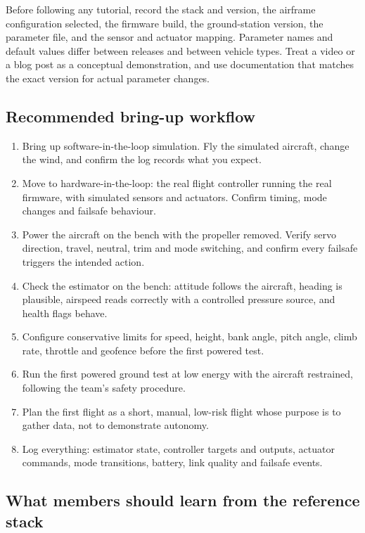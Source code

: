 \documentclass[11pt,a4paper]{article}
\begin{document}
Before following any tutorial, record the stack and version, the airframe
configuration selected, the firmware build, the ground-station version, the
parameter file, and the sensor and actuator mapping. Parameter names and
default values differ between releases and between vehicle types. Treat a video
or a blog post as a conceptual demonstration, and use documentation that
matches the exact version for actual parameter changes.

\subsection{Recommended bring-up workflow}

\begin{enumerate}
  \item Bring up software-in-the-loop simulation. Fly the simulated aircraft, change the wind, and confirm the log records what you expect.
  \item Move to hardware-in-the-loop: the real flight controller running the real firmware, with simulated sensors and actuators. Confirm timing, mode changes and failsafe behaviour.
  \item Power the aircraft on the bench with the propeller removed. Verify servo direction, travel, neutral, trim and mode switching, and confirm every failsafe triggers the intended action.
  \item Check the estimator on the bench: attitude follows the aircraft, heading is plausible, airspeed reads correctly with a controlled pressure source, and health flags behave.
  \item Configure conservative limits for speed, height, bank angle, pitch angle, climb rate, throttle and geofence before the first powered test.
  \item Run the first powered ground test at low energy with the aircraft restrained, following the team's safety procedure.
  \item Plan the first flight as a short, manual, low-risk flight whose purpose is to gather data, not to demonstrate autonomy.
  \item Log everything: estimator state, controller targets and outputs, actuator commands, mode transitions, battery, link quality and failsafe events.
\end{enumerate}

\subsection{What members should learn from the reference stack}
\end{document}
